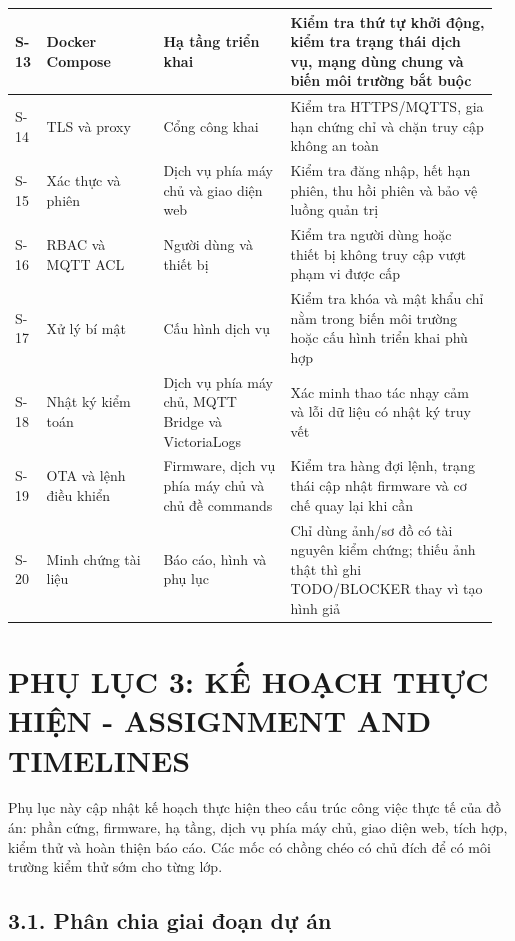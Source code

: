 \documentclass[a4paper]{extarticle}
\newcommand{\thesisterm}[1]{{\rmfamily #1}}
\newcommand{\appendixsection}[1]{\clearpage\section{#1}}
\begin{document}
{\begin{longtable}{|L{0.060\linewidth}|L{0.230\linewidth}|L{0.255\linewidth}|L{0.415\linewidth}|}
S-13 & Docker Compose & Hạ tầng triển khai & Kiểm tra thứ tự khởi động, kiểm tra trạng thái dịch vụ, mạng dùng chung và biến môi trường bắt buộc \\\hline
S-14 & TLS và proxy & Cổng công khai & Kiểm tra HTTPS/MQTTS, gia hạn chứng chỉ và chặn truy cập không an toàn \\\hline
S-15 & Xác thực và phiên & Dịch vụ phía máy chủ và giao diện web & Kiểm tra đăng nhập, hết hạn phiên, thu hồi phiên và bảo vệ luồng quản trị \\\hline
S-16 & RBAC và MQTT ACL & Người dùng và thiết bị & Kiểm tra người dùng hoặc thiết bị không truy cập vượt phạm vi được cấp \\\hline
S-17 & Xử lý bí mật & Cấu hình dịch vụ & Kiểm tra khóa và mật khẩu chỉ nằm trong biến môi trường hoặc cấu hình triển khai phù hợp \\\hline
S-18 & Nhật ký kiểm toán & Dịch vụ phía máy chủ, MQTT Bridge và VictoriaLogs & Xác minh thao tác nhạy cảm và lỗi dữ liệu có nhật ký truy vết \\\hline
S-19 & OTA và lệnh điều khiển & Firmware, dịch vụ phía máy chủ và chủ đề \thesisterm{commands} & Kiểm tra hàng đợi lệnh, trạng thái cập nhật firmware và cơ chế quay lại khi cần \\\hline
S-20 & Minh chứng tài liệu & Báo cáo, hình và phụ lục & Chỉ dùng ảnh/sơ đồ có tài nguyên kiểm chứng; thiếu ảnh thật thì ghi TODO/BLOCKER thay vì tạo hình giả \\\hline
\end{longtable}
}


\appendixsection{PHỤ LỤC 3: KẾ HOẠCH THỰC HIỆN - ASSIGNMENT AND TIMELINES}

Phụ lục này cập nhật kế hoạch thực hiện theo cấu trúc công việc thực tế của đồ
án: phần cứng, firmware, hạ tầng, dịch vụ phía máy chủ, giao diện web, tích hợp,
kiểm thử và hoàn thiện báo cáo. Các mốc có chồng chéo có chủ đích để có môi
trường kiểm thử sớm cho từng lớp.

\subsection{3.1. Phân chia giai đoạn dự án}\label{app3-project-phases-cap-nhat}
\end{document}
